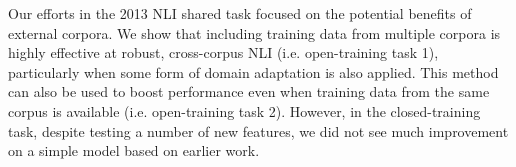 Our efforts in the 2013 NLI shared task focused on the potential benefits of external corpora. We show that including training data from multiple corpora is
 highly effective at robust, cross-corpus NLI (i.e. open-training task 1),
 particularly when some form of domain adaptation is also applied. This method
 can also be used to boost performance even when training data from the same
 corpus is available (i.e. open-training task 2). However, in the
 closed-training task, despite testing a number of new features, we did not see
 much improvement on a simple model based on earlier work.

